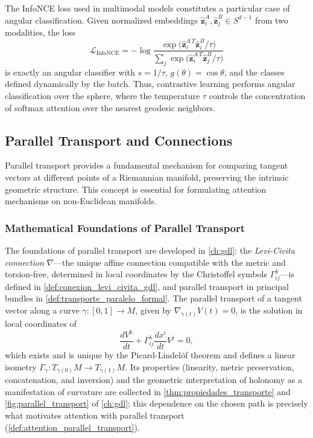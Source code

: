 \begin{remark}\label{rem:contrastive_sphere}
The InfoNCE loss used in multimodal models constitutes a particular case of angular classification. Given normalized embeddings $\hat{\mathbf{z}}_i^A, \hat{\mathbf{z}}_j^B \in S^{d-1}$ from two modalities, the loss
\[
\mathcal{L}_{\text{InfoNCE}} = -\log \frac{\exp\bigl(\hat{\mathbf{z}}_i^{A\,T} \hat{\mathbf{z}}_i^B / \tau\bigr)}{\sum_{j} \exp\bigl(\hat{\mathbf{z}}_i^{A\,T} \hat{\mathbf{z}}_j^B / \tau\bigr)}
\]
is exactly an angular classifier with $s = 1/\tau$, $g(\theta) = \cos\theta$, and the classes defined dynamically by the batch. Thus, contrastive learning performs angular classification over the sphere, where the temperature $\tau$ controls the concentration of softmax attention over the nearest geodesic neighbors.
\end{remark}

\subsection{Parallel Transport and Connections}

Parallel transport provides a fundamental mechanism for comparing tangent vectors at different points of a Riemannian manifold, preserving the intrinsic geometric structure. This concept is essential for formulating attention mechanisms on non-Euclidean manifolds.

\subsubsection{Mathematical Foundations of Parallel Transport}

The foundations of parallel transport are developed in \autoref{ch:gdl}: the \textit{Levi-Civita connection} $\nabla$---the unique affine connection compatible with the metric and torsion-free, determined in local coordinates by the Christoffel symbols $\Gamma^k_{ij}$---is defined in \autoref{def:conexion_levi_civita_gdl}, and parallel transport in principal bundles in \autoref{def:transporte_paralelo_formal}. The parallel transport of a tangent vector along a curve $\gamma: [0,1] \to M$, given by $\nabla_{\dot{\gamma}(t)} V(t) = 0$, is the solution in local coordinates of
\begin{equation}
\frac{dV^k}{dt} + \Gamma^k_{ij} \frac{dx^i}{dt} V^j = 0,
\label{eq:parallel_transport_coordinates}
\end{equation}
which exists and is unique by the Picard-Lindelöf theorem and defines a linear isometry $\Gamma_\gamma: T_{\gamma(0)}M \to T_{\gamma(1)}M$. Its properties (linearity, metric preservation, concatenation, and inversion) and the geometric interpretation of holonomy as a manifestation of curvature are collected in \autoref{thm:propiedades_transporte} and \autoref{fig:parallel_transport} of \autoref{ch:gdl}; this dependence on the chosen path is precisely what motivates attention with parallel transport (\autoref{def:attention_parallel_transport}).

